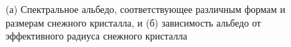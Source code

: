 \documentclass[a4paper, fontsize=14pt]{scrartcl}
\begin{document}
\begin{figure}[H]
    \begin{minipage}[h]{0.85\linewidth}
    \end{minipage}
    \hfill
    \begin{minipage}[h]{0.8\linewidth}
    \end{minipage}
    \caption{(а) Спектральное альбедо, соответствующее различным формам и размерам снежного кристалла, и (б) зависимость альбедо от эффективного радиуса снежного кристалла}
    \label{fig:image}
\end{figure}
\end{document}
